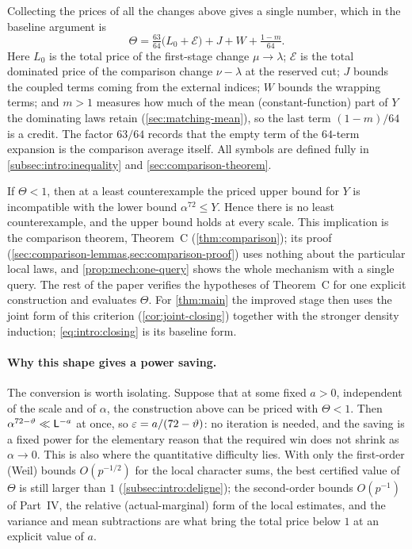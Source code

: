 Collecting the prices of all the changes above gives a single
number, which in the baseline argument is
\begin{equation}\label{eq:intro:closing}
 \Theta=\tfrac{63}{64}\bigl(L_0+\mathcal E\bigr)+J+W+\tfrac{1-m}{64}.
\end{equation}
Here $L_0$ is the total price of the first-stage change
$\mu\to\lambda$; $\mathcal E$ is the total dominated price of the
comparison change $\nu-\lambda$ at the reserved cut; $J$ bounds
the coupled terms coming from the external indices; $W$ bounds
the wrapping terms; and $m>1$ measures how much of the mean
(constant-function) part of $Y$ the dominating laws retain
(\cref{sec:matching-mean}), so the last term $(1-m)/64$ is a
credit. The factor $63/64$ records that the empty term of the
$64$-term expansion is the comparison average itself. All symbols
are defined fully in \cref{subsec:intro:inequality} and
\cref{sec:comparison-theorem}.

If $\Theta<1$, then at a least counterexample the priced upper
bound for $Y$ is incompatible with the lower bound
$\alpha^{72}\le Y$. Hence there is no least counterexample, and
the upper bound holds at every scale. This implication is the
comparison theorem, Theorem~C (\cref{thm:comparison}); its proof
(\cref{sec:comparison-lemmas,sec:comparison-proof}) uses nothing
about the particular local laws, and \cref{prop:mech:one-query}
shows the whole mechanism with a single query. The rest of the
paper verifies the hypotheses of Theorem~C for one explicit
construction and evaluates $\Theta$. For \cref{thm:main} the
improved stage then uses the joint form of this criterion
(\cref{cor:joint-closing}) together with the stronger density
induction; \eqref{eq:intro:closing} is its baseline form.

\paragraph{Why this shape gives a power saving.}
The conversion is worth isolating. Suppose that at some fixed
$a>0$, independent of the scale and of $\alpha$, the construction
above can be priced with $\Theta<1$. Then
$\alpha^{72-\vartheta}\ll\mathsf L^{-a}$ at once, so
$\varepsilon=a/(72-\vartheta)$: no iteration is needed, and the saving is
a fixed power for the elementary reason that the required win does
not shrink as $\alpha\to0$. This is also where the quantitative
difficulty lies. With only the first-order (Weil) bounds
$O(p^{-1/2})$ for the local character sums, the best certified
value of $\Theta$ is still larger than $1$
(\cref{subsec:intro:deligne}); the second-order bounds
$O(p^{-1})$ of Part~IV, the relative (actual-marginal) form of the
local estimates, and the variance and mean subtractions are what
bring the total price below $1$ at an explicit value of $a$.

